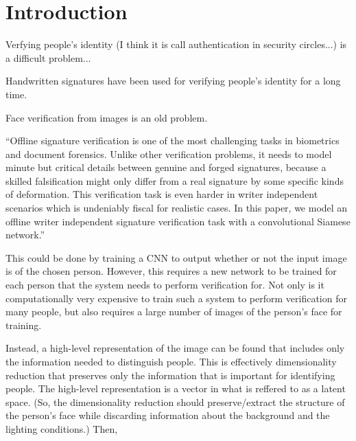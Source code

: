 \section{Introduction}\label{sec:introduction}

Verfying people's identity (I think it is call authentication in security circles...) is a difficult problem...

Handwritten signatures have been used for verifying people's identity for a long time.

Face verification from images is an old problem.

``Offline signature verification is one of the most challenging tasks in biometrics and document forensics. Unlike other verification problems, it needs to model minute but critical details between genuine
and forged signatures, because a skilled falsification might only differ from a real signature by some
specific kinds of deformation. This verification task is even harder in writer independent scenarios
which is undeniably fiscal for realistic cases. In this paper, we model an offline writer independent
signature verification task with a convolutional Siamese network.''\cite{sig_net}

This could be done by training a CNN to output whether or not the input image is of the chosen person.
However, this requires a new network to be trained for each person that the system needs to perform verification for.
Not only is it computationally very expensive to train such a system to perform verification for many people, but also requires a large number of images of the person's face for training.

Instead, a high-level representation of the image can be found that includes only the information needed to distinguish people.
This is effectively dimensionality reduction that preserves only the information that is important for identifying people.
The high-level representation is a vector in what is reffered to as a latent space.
(So, the dimensionality reduction should preserve/extract the structure of the person's face while discarding information about the background and the lighting conditions.)
Then, 
